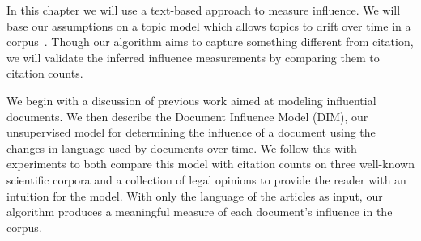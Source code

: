 

In this chapter we will use a text-based approach to measure influence.
We will base our assumptions on a topic model which allows topics to drift
over time in a corpus~\citep{blei:2006}. Though our algorithm aims to
capture something different from citation, we will validate the
inferred influence measurements by comparing them to citation counts.

We begin with a discussion of previous work aimed at modeling
influential documents.  We then describe the Document Influence Model
(DIM), our unsupervised model for determining the influence of a
document using the changes in language used by documents over time.
We follow this with experiments to both compare this model with
citation counts on three well-known scientific corpora and a
collection of legal opinions to provide the reader with an intuition
for the model. With only the language of the articles as input, our
algorithm produces a meaningful measure of each document's influence
in the corpus.
